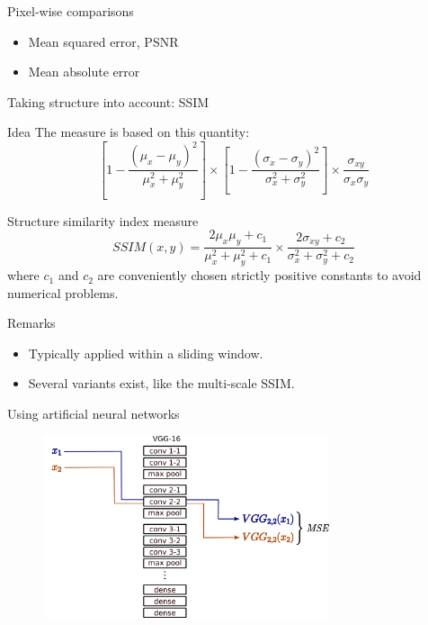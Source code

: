 \documentclass[xcolor=pdftex,dvipsnames,table,mathserif]{beamer}
\begin{document}
\begin{frame}{Pixel-wise comparisons}

  \begin{itemize}
  \item Mean squared error, PSNR
  \item Mean absolute error
  \end{itemize}

\end{frame}

\begin{frame}{Taking structure into account: SSIM}

\begin{block}{Idea}
  The measure is based on this quantity:
  $$
\left[1-\frac{(\mu_x-\mu_y)^2}{\mu_x^2+\mu_y^2}\right]\times\left[1-\frac{(\sigma_x-\sigma_y)^2}{\sigma_x^2+\sigma_y^2}\right]\times\frac{\sigma_{xy}}{\sigma_x\sigma_y}
  $$
\end{block}

\pause

\begin{block}{Structure similarity index measure}
  $$
  SSIM(x, y) = \frac{2\mu_x\mu_y+c_1}{\mu_x^2+\mu_y^2+c_1}\times\frac{2\sigma_{xy}+c_2}{\sigma_x^2+\sigma_y^2+c_2}
  $$
  where $c_1$ and $c_2$ are conveniently chosen strictly positive constants to avoid numerical problems.
\end{block}

\pause

\begin{block}{Remarks}

 \begin{itemize}
 \item Typically applied within a sliding window.
 \item Several variants exist, like the multi-scale SSIM.
 \end{itemize}

\end{block}

\end{frame}


\begin{frame}{Using artificial neural networks}

  \begin{figure}[ht]
    \centering
    \includegraphics[width=0.75\textwidth]{vgg_qual.png}
  \end{figure}


\end{frame}
\end{document}

